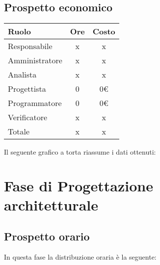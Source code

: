 {{{\subsection{Prospetto economico}\label{5.2.2}
\quad
\def\tabularxcolumn#1{m{#1}}
{	
	\begin{center}
		\renewcommand{\arraystretch}{1.4}
		\begin{tabularx}{7cm}{|X|c|c|}
			\hline
			\rowcolor{airforceblue}
			\textbf{Ruolo} & \textbf{Ore} & \textbf{Costo}\\
			\hline
			Responsabile & x & x\\
			\hline
			Amministratore & x & x\\
			\hline
			Analista & x & x\\
			\hline
			Progettista & 0 & 0\euro\\
			\hline
			Programmatore & 0 & 0\euro\\
			\hline
			Verificatore & x & x\\
			\hline
			Totale & x & x\\
			\hline
		\end{tabularx}
	\end{center}

Il seguente grafico a torta riassume i dati ottenuti:

\section{Fase di Progettazione architetturale}\label{5.3}

\subsection{Prospetto orario}\label{5.3.1}
In questa fase la distribuzione oraria è la seguente:
\quad
\def\tabularxcolumn#1{m{#1}}
{
	
}}}}}
